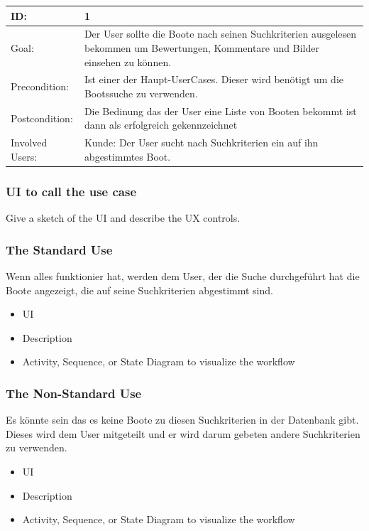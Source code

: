 \documentclass[12pt]{article}
\theoremstyle{definition}
\newenvironment{explanation}{%
   \setlength{\parindent}{0pt}
   \itshape
   \color{blue}
}{}
\begin{document}
\begin{tabular}{|p{.2\linewidth}|p{.65\linewidth}|}
\hline 
ID: & 1 \\ \hline
Goal: & Der User sollte die Boote nach seinen Suchkriterien ausgelesen bekommen um Bewertungen, Kommentare und Bilder einsehen zu können. \\ \hline
Precondition: & Ist einer der Haupt-UserCases. Dieser wird benötigt um die Bootssuche zu verwenden. \\ \hline
Postcondition: & Die Bedinung das der User eine Liste von Booten bekommt ist dann als erfolgreich gekennzeichnet \\ \hline
Involved Users: &Kunde: Der User sucht nach Suchkriterien ein auf ihn abgestimmtes Boot. \\ \hline
\end{tabular}

\subsubsection{UI to call the use case}
\begin{explanation}
Give a sketch of the UI and describe the UX controls.
\end{explanation}

\subsubsection{The Standard Use}
\begin{explanation}
Wenn alles funktionier hat, werden dem User, der die Suche durchgeführt hat die Boote angezeigt, die auf seine Suchkriterien abgestimmt sind.
\begin{itemize}
	\item UI
	\item Description
	\item Activity, Sequence, or State Diagram to visualize the workflow
\end{itemize}
\end{explanation}

\subsubsection{The Non-Standard Use}
\begin{explanation}
Es könnte sein das es keine Boote zu diesen Suchkriterien in der Datenbank gibt. Dieses wird dem User mitgeteilt und er wird darum gebeten andere Suchkriterien zu verwenden.
\begin{itemize}
	\item UI
	\item Description
	\item Activity, Sequence, or State Diagram to visualize the workflow
\end{itemize}
\end{explanation}
\pagebreak
\end{document}

